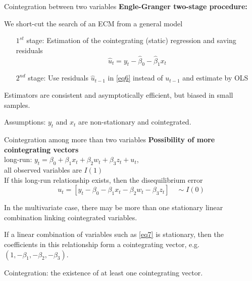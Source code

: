 \documentclass{beamer}
\begin{document}

\begin{frame}{Cointegration between two variables}
\textbf{Engle-Granger two-stage procedure:}

\medskip
We short-cut the search of an ECM from a general model
\begin{itemize}
\item[ $1^{st}$ ]  stage: Estimation of the cointegrating (static) regression and saving residuals $$\hat{u}_t = y_t - \hat{\beta}_0 - \hat{\beta}_1 x_t$$
\item [$2^{nd}$]  stage: Use residuals $\hat{u}_{t-1}$ in \eqref{eq6} instead of $u_{t-1}$ and estimate by OLS
\end{itemize}
Estimators are consistent and asymptotically efficient, but biased in small samples. 

\medskip
\small{Assumptions: $y_t$ and $x_t$ are non-stationary and cointegrated.}
\end{frame}


\begin{frame}{Cointegration among more than two variables}
\textbf{Possibility of more cointegrating vectors}\\
long-run: $y_t= \beta_0 + \beta_1 x_t + \beta_2 w_t + \beta_3 z_t + u_t$,\\ all observed variables are $I(1)$\\
\medskip
If this long-run relationship exists, then the disequilibrium error \\
\begin{equation}  \label{eq7}
u_t= [y_t - \beta_0 - \beta_1 x_t - \beta_2 w_t - \beta_3 z_t ]
\quad \sim I(0) 
\end{equation} 

\vspace{0.3cm}
In the multivariate case, there may be more than one stationary linear combination linking cointegrated variables. 

\vspace{0.3cm}
If a linear combination of variables such as \eqref{eq7} is stationary, then the coefficients in this relationship form a cointegrating vector, e.g. $(1,-\beta_{1},-\beta_{2},-\beta_{3})$. 

\vspace{0.3cm} 
Cointegration: the existence of at least one cointegrating vector.

\end{frame}
\end{document}
